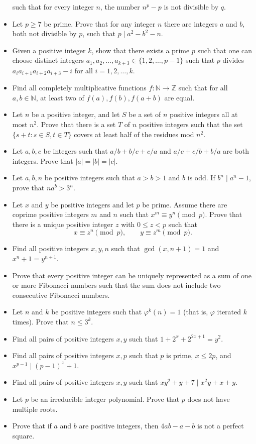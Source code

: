 \begin{itemize}
    such that for every integer $n$, the number $n^p-p$ is not divisible by $q$.
  \item Let $p\ge 7$ be prime. Prove that for any integer $n$ there are integers $a$ and
    $b$, both not divisible by $p$, such that $p\mid a^2-b^2-n$.
  \item Given a positive integer $k$, show that there exists a prime $p$ such
    that one can choose distinct integers
    $a_1,a_2,\ldots,a_{k+3}\in\{1,2,\ldots,p-1\}$ such that $p$ divides
    $a_i a_{i+1}a_{i+2}a_{i+3}-i$ for all $i=1,2,\ldots,k$.
  \item Find all completely multiplicative functions $f:\mathbb N\to\mathbb Z$
    such that for all $a,b\in\mathbb N$, at least two of $f(a),f(b),f(a+b)$ are
    equal.
  \item Let $n$ be a positive integer, and let $S$ be a set of $n$ positive
    integers all at most $n^2$. Prove that there is a set $T$ of $n$ positive
    integers such that the set $\{s+t:s\in S,t\in T\}$ covers at least half of
    the residues mod $n^2$.
  \item Let $a,b,c$ be integers such that $a/b+b/c+c/a$ and $a/c+c/b+b/a$ are
    both integers. Prove that $|a|=|b|=|c|$.
  \item Let $a,b,n$ be positive integers such that $a>b>1$ and $b$ is odd. If
    $b^n\mid a^n-1$, prove that $na^b>3^n$.
  \item Let $x$ and $y$ be positive integers and let $p$ be prime. Assume there
    are coprime positive integers $m$ and $n$ such that $x^m\equiv y^n\pmod p$.
    Prove that there is a unique positive integer $z$ with $0\le z<p$ such that
    \[x\equiv z^n\pmod p,\qquad y\equiv z^m\pmod p.\]
  \item Find all positive integers $x,y,n$ such that $\gcd(x,n+1)=1$ and
    $x^n+1=y^{n+1}$.
    \item Prove that every positive integer can be uniquely represented as a sum
      of one or more Fibonacci numbers such that the sum does not include two
      consecutive Fibonacci numbers.
  \item Let $n$ and $k$ be positive integers such that $\varphi^k(n)=1$ (that
    is, $\varphi$ iterated $k$ times). Prove that
    $n\le 3^k$.
  \item Find all pairs of positive integers $x,y$ such that
    $1+2^x+2^{2x+1}=y^2$.
  \item Find all pairs of positive integers $x,p$ such that $p$ is prime, $x\le
    2p$, and $x^{p-1}\mid (p-1)^x+1$.
  \item Find all pairs of positive integers $x,y$ such that $xy^2+y+7\mid
    x^2y+x+y$.
  \item Let $p$ be an irreducible integer polynomial. Prove that $p$ does not
    have multiple roots.
  \item Prove that if $a$ and $b$ are positive integers, then $4ab-a-b$ is not a
    perfect square.
\end{itemize}
